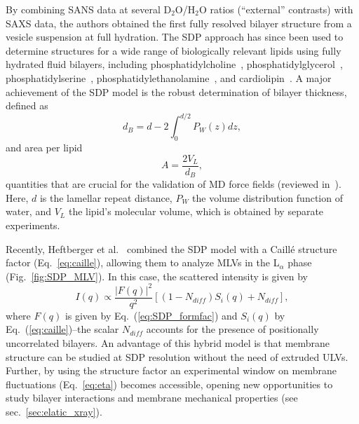 \documentclass[8.5pt,twoside,twocolumn]{article}
\begin{document}
By combining SANS data at several D$_2$O/H$_2$O ratios (``external'' contrasts) with SAXS data, the authors obtained the first fully resolved bilayer structure from a vesicle suspension at full hydration. The SDP approach has since been used to determine structures for a wide range of biologically relevant lipids using fully hydrated fluid bilayers, including phosphatidylcholine~\cite{Kucerka.2009,Kucerka.2011}, phosphatidylglycerol~\cite{Pan.2014b}, phosphatidylserine~\cite{Pan.2014}, phosphatidylethanolamine~\cite{Kucerka.2015}, and cardiolipin~\cite{Pan.2015}. A major achievement of the SDP model is the robust determination of bilayer thickness, defined as
%
\begin{equation}
	d_B = d - 2\int_{0}^{d/2} P_W(z) dz,
\end{equation}
%
and area per lipid  
%
\begin{equation}
	A = \frac{2 V_L}{d_B},
\end{equation}
%
quantities that are crucial for the validation of MD force fields (reviewed in~\cite{Heberle.2012}). Here, $d$ is the lamellar repeat distance, $P_W$ the volume distribution function of water, and $V_L$ the lipid's molecular volume, which is obtained by separate experiments.

Recently, Heftberger et al.~\cite{Heftberger.2014} combined the SDP model with a Caill\'{e} structure factor (Eq.~\ref{eq:caille}), allowing them to analyze MLVs in the L$_\alpha$ phase (Fig.~\ref{fig:SDP_MLV}). In this case, the scattered intensity is given by
\begin{equation}
\label{eq:SDP_GAP}
	I(q) \propto \frac{|F(q)|^2}{q^2}\left[(1-N_{diff}) S_i(q) + N_{diff} \right],
\end{equation}
where $F(q)$ is given by Eq.~(\ref{eq:SDP_formfac}) and $S_i(q)$ by Eq.~(\ref{eq:caille})--the scalar $N_{diff}$ accounts for the presence of positionally uncorrelated bilayers. An advantage of this hybrid model is that membrane structure can be studied at SDP resolution without the need of extruded ULVs.  Further, by using the structure factor an experimental window on membrane fluctuations (Eq.~\ref{eq:eta}) becomes accessible, opening new opportunities to study bilayer interactions and membrane mechanical properties (see sec.~\ref{sec:elatic_xray}).
\end{document}
